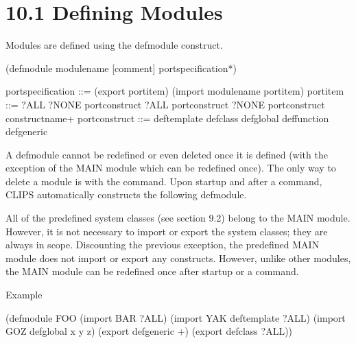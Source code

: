 \documentclass[letterpaper,10pt,english]{sphinxmanual}
\begin{document}
\section{10.1 Defining Modules}
\label{\detokenize{defmodule:defining-modules}}
Modules are defined using the defmodule construct.


\begin{sphinxVerbatim}[commandchars=\\\{\}]
(defmodule \PYGZlt{}module\PYGZhy{}name\PYGZgt{} [\PYGZlt{}comment\PYGZgt{}] \PYGZlt{}port\PYGZhy{}specification\PYGZgt{}*)

\PYGZlt{}port\PYGZhy{}specification\PYGZgt{} ::= (export \PYGZlt{}port\PYGZhy{}item\PYGZgt{}) \textbar{}
  (import \PYGZlt{}module\PYGZhy{}name\PYGZgt{} \PYGZlt{}port\PYGZhy{}item\PYGZgt{})
  \PYGZlt{}port\PYGZhy{}item\PYGZgt{} ::= ?ALL \textbar{}
  ?NONE \textbar{}
  \PYGZlt{}port\PYGZhy{}construct\PYGZgt{} ?ALL \textbar{}
  \PYGZlt{}port\PYGZhy{}construct\PYGZgt{} ?NONE \textbar{}
  \PYGZlt{}port\PYGZhy{}construct\PYGZgt{} \PYGZlt{}construct\PYGZhy{}name\PYGZgt{}+
  \PYGZlt{}port\PYGZhy{}construct\PYGZgt{} ::= deftemplate \textbar{} defclass \textbar{}
  defglobal \textbar{} deffunction \textbar{}
  defgeneric
\end{sphinxVerbatim}

A defmodule cannot be redefined or even deleted once it is defined (with
the exception of the MAIN module which can be redefined once). The only
way to delete a module is with the  command. Upon startup and
after a  command, CLIPS automatically constructs the following
defmodule.

\begin{sphinxVerbatim}[commandchars=\\\{\}]
 
\end{sphinxVerbatim}

All of the predefined system classes (see section 9.2) belong to the
MAIN module. However, it is not necessary to import or export the system
classes; they are always in scope. Discounting the previous exception,
the predefined MAIN module does not import or export any constructs.
However, unlike other modules, the MAIN module can be redefined once
after startup or a  command.

Example

\begin{sphinxVerbatim}[commandchars=\\\{\}]
(defmodule FOO
  (import BAR ?ALL)
  (import YAK deftemplate ?ALL)
  (import GOZ defglobal x y z)
  (export defgeneric +)
  (export defclass ?ALL))
\end{sphinxVerbatim}
\end{document}
